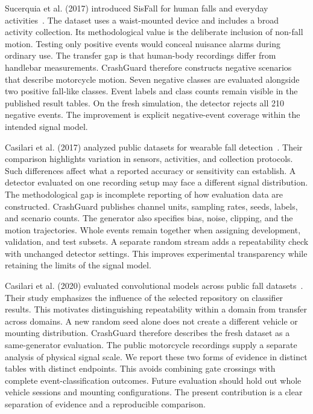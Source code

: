 \documentclass[10pt,a4paper]{article}
\begin{document}
Sucerquia et al. (2017) introduced SisFall for human falls and everyday activities~\cite{sisfall}. The dataset uses a waist-mounted device and includes a broad activity collection. Its methodological value is the deliberate inclusion of non-fall motion. Testing only positive events would conceal nuisance alarms during ordinary use. The transfer gap is that human-body recordings differ from handlebar measurements. CrashGuard therefore constructs negative scenarios that describe motorcycle motion. Seven negative classes are evaluated alongside two positive fall-like classes. Event labels and class counts remain visible in the published result tables. On the fresh simulation, the detector rejects all 210 negative events. The improvement is explicit negative-event coverage within the intended signal model.


Casilari et al. (2017) analyzed public datasets for wearable fall detection~\cite{survey}. Their comparison highlights variation in sensors, activities, and collection protocols. Such differences affect what a reported accuracy or sensitivity can establish. A detector evaluated on one recording setup may face a different signal distribution. The methodological gap is incomplete reporting of how evaluation data are constructed. CrashGuard publishes channel units, sampling rates, seeds, labels, and scenario counts. The generator also specifies bias, noise, clipping, and the motion trajectories. Whole events remain together when assigning development, validation, and test subsets. A separate random stream adds a repeatability check with unchanged detector settings. This improves experimental transparency while retaining the limits of the signal model.


Casilari et al. (2020) evaluated convolutional models across public fall datasets~\cite{cnn}. Their study emphasizes the influence of the selected repository on classifier results. This motivates distinguishing repeatability within a domain from transfer across domains. A new random seed alone does not create a different vehicle or mounting distribution. CrashGuard therefore describes the fresh dataset as a same-generator evaluation. The public motorcycle recordings supply a separate analysis of physical signal scale. We report these two forms of evidence in distinct tables with distinct endpoints. This avoids combining gate crossings with complete event-classification outcomes. Future evaluation should hold out whole vehicle sessions and mounting configurations. The present contribution is a clear separation of evidence and a reproducible comparison.
\end{document}
